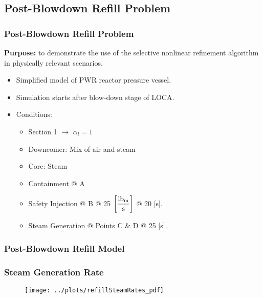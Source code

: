 \documentclass[compress,xcolor=table]{beamer}
\begin{document}
\subsection[Post-Blowdown Refill Problem]{Post-Blowdown Refill Problem}
\begin{frame}[shrink=5]
\frametitle{Post-Blowdown Refill Problem}

\textbf{Purpose:} to demonstrate the use of the selective nonlinear refinement algorithm in physically relevant scenarios.

\begin{itemize}
\item{Simplified model of PWR reactor pressure vessel.}
\item{Simulation starts after blow-down stage of LOCA.}
\item{Conditions:
\begin{itemize}
\item{Section 1 $\rightarrow$ $\alpha_{l} = 1$}
\item{Downcomer: Mix of air and steam}
\item{Core: Steam}
\item{Containment @ A}
\item{Safety Injection @ B @ 25 $\displaystyle \left[ \frac{\lbm{}}{\text{s}} \right]$ @ 20 [s].}
\item{Steam Generation @ Points C \& D @ 25 [s].}
\end{itemize}
}
\end{itemize}


\end{frame}
\begin{frame}
\frametitle{Post-Blowdown Refill Model}

\begin{center}
\resizebox{0.75\textwidth}{0.75\textheight}{

}
\end{center}

\end{frame}
\begin{frame}
\frametitle{Steam Generation Rate}

\begin{figure}[h!t]
\centering
\texttt{[image: ../plots/refillSteamRates\_pdf]}
\end{figure}

\end{frame}
\end{document}

